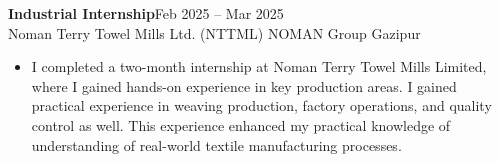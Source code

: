 

 \textbf{Industrial Internship}\hfill Feb 2025 – Mar 2025\\
 \vspace{1mm}
 Noman Terry Towel Mills Ltd. (NTTML) \textbar{} NOMAN Group \hfill Gazipur\\
\begin{itemize}
\item  
\vspace{-2mm}
\begin{justify}I completed a two-month internship at Noman Terry Towel Mills Limited, where I gained hands-on experience in key production areas. I gained practical experience in weaving production, factory operations, and quality control as well. This experience enhanced my practical knowledge of understanding of real-world textile manufacturing processes.
\end{justify}
\end{itemize}